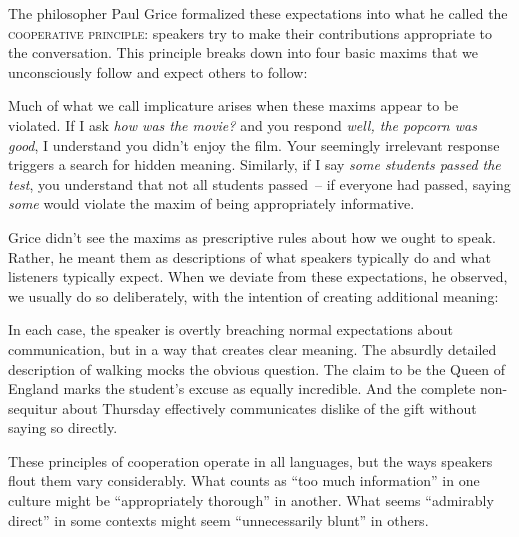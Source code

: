 The philosopher Paul Grice formalized these expectations into what he called the \textsc{cooperative principle}: speakers try to make their contributions appropriate to the conversation. This principle breaks down into four basic maxims that we unconsciously follow and expect others to follow:

\ea
   \z
\z

Much of what we call implicature arises when these maxims appear to be violated. If I ask \textit{how was the movie?} and you respond \textit{well, the popcorn was good}, I understand you didn't enjoy the film. Your seemingly irrelevant response triggers a search for hidden meaning. Similarly, if I say \textit{some students passed the test}, you understand that not all students passed~-- if everyone had passed, saying \textit{some} would violate the maxim of being appropriately informative.

Grice didn't see the maxims as prescriptive rules about how we ought to speak. Rather, he meant them as descriptions of what speakers typically do and what listeners typically expect. When we deviate from these expectations, he observed, we usually do so deliberately, with the intention of creating additional meaning:

\ea
   \z
\z

In each case, the speaker is overtly breaching normal expectations about communication, but in a way that creates clear meaning. The absurdly detailed description of walking mocks the obvious question. The claim to be the Queen of England marks the student's excuse as equally incredible. And the complete non-sequitur about Thursday effectively communicates dislike of the gift without saying so directly.

These principles of cooperation operate in all languages, but the ways speakers flout them vary considerably. What counts as ``too much information'' in one culture might be ``appropriately thorough'' in another. What seems ``admirably direct'' in some contexts might seem ``unnecessarily blunt'' in others. 

